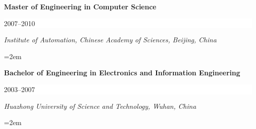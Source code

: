 \documentclass[paper=letter,fontsize=10pt]{scrartcl} %
\newcommand{\NewPart}[2]{\section*{{#1} #2}}
\newcommand{\EducationEntry}[4]{
		\noindent \textbf{#1} \hfill      %
		\colorbox{White}{%
			\parbox{6em}{%
			\hfill\color{Black}#2}} \par  %
		\noindent \textit{#3} \par        %
		\noindent\hangindent=2em\hangafter=0 \small #4 %
		\normalsize \par}
\begin{document}
\EducationEntry{Master of Engineering in Computer Science}{2007--2010}{Institute of Automation, Chinese Academy of Sciences, Beijing, China}{}

\EducationEntry{Bachelor of Engineering in Electronics and Information Engineering}{2003--2007}{Huazhong University of Science and Technology, Wuhan, China}{}


%


\end{document}
